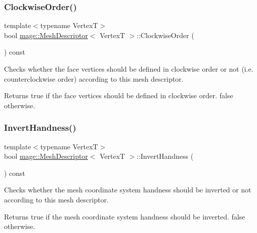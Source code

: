 \subsubsection{\texorpdfstring{Clockwise\+Order()}{ClockwiseOrder()}}
{\footnotesize\ttfamily template$<$typename VertexT$>$ \\
bool \hyperlink{structmage_1_1_mesh_descriptor}{mage\+::\+Mesh\+Descriptor}$<$ VertexT $>$\+::Clockwise\+Order (\begin{DoxyParamCaption}{ }\end{DoxyParamCaption}) const}

Checks whether the face vertices should be defined in clockwise order or not (i.\+e. counterclockwise order) according to this mesh descriptor.

\begin{DoxyReturn}{Returns}
{\ttfamily true} if the face vertices should be defined in clockwise order. {\ttfamily false} otherwise. 
\end{DoxyReturn}
\hypertarget{structmage_1_1_mesh_descriptor_a7f63b926282683dcb0f674eca0901f5e}{}\label{structmage_1_1_mesh_descriptor_a7f63b926282683dcb0f674eca0901f5e} 
\subsubsection{\texorpdfstring{Invert\+Handness()}{InvertHandness()}}
{\footnotesize\ttfamily template$<$typename VertexT$>$ \\
bool \hyperlink{structmage_1_1_mesh_descriptor}{mage\+::\+Mesh\+Descriptor}$<$ VertexT $>$\+::Invert\+Handness (\begin{DoxyParamCaption}{ }\end{DoxyParamCaption}) const}

Checks whether the mesh coordinate system handness should be inverted or not according to this mesh descriptor.

\begin{DoxyReturn}{Returns}
{\ttfamily true} if the mesh coordinate system handness should be inverted. {\ttfamily false} otherwise. 
\end{DoxyReturn}
\hypertarget{structmage_1_1_mesh_descriptor_aef6a9568a8d4516dbeff4d8f665ca213}{}\label{structmage_1_1_mesh_descriptor_aef6a9568a8d4516dbeff4d8f665ca213} 
